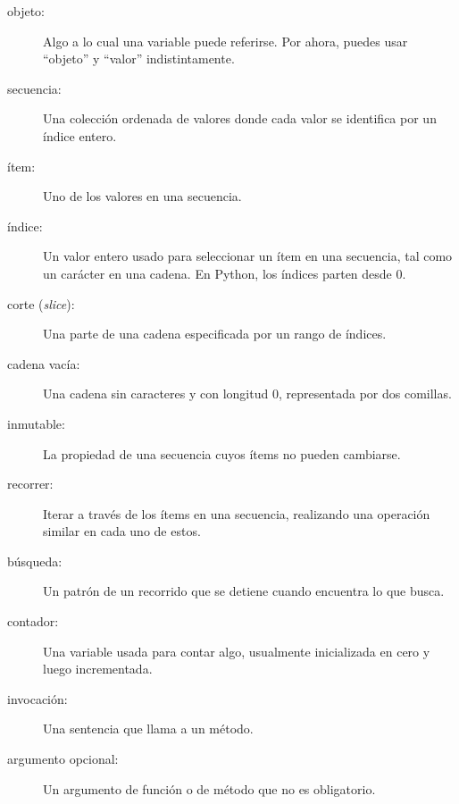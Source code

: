 \documentclass[10pt]{book}
\begin{document}
\begin{description}

\item[objeto:] Algo a lo cual una variable puede referirse.  Por ahora,
puedes usar ``objeto'' y ``valor'' indistintamente.

\item[secuencia:] Una colección ordenada de
valores donde cada valor se identifica por un índice entero.

\item[ítem:] Uno de los valores en una secuencia.

\item[índice:] Un valor entero usado para seleccionar un ítem en
una secuencia, tal como un carácter en una cadena.  En Python,
los índices parten desde 0.

\item[corte ({\em slice}):] Una parte de una cadena especificada por un rango de índices.

\item[cadena vacía:] Una cadena sin caracteres y con longitud 0, representada
por dos comillas.

\item[inmutable:] La propiedad de una secuencia cuyos ítems no pueden
cambiarse.

\item[recorrer:] Iterar a través de los ítems en una secuencia,
realizando una operación similar en cada uno de estos.

\item[búsqueda:] Un patrón de un recorrido que se detiene
cuando encuentra lo que busca.

\item[contador:] Una variable usada para contar algo, usualmente inicializada
en cero y luego incrementada.

\item[invocación:] Una sentencia que llama a un método.

\item[argumento opcional:] Un argumento de función o de método que no es
obligatorio.

\end{description}
\end{document}
